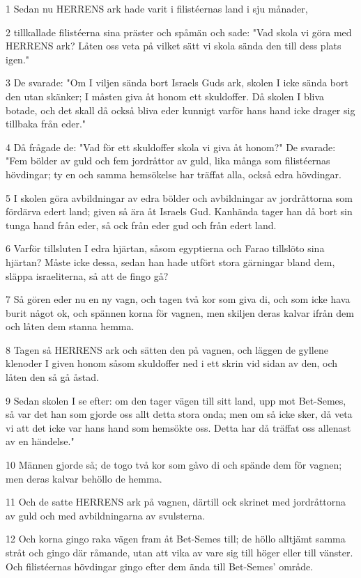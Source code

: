 \par 1 Sedan nu HERRENS ark hade varit i filistéernas land i sju månader,
\par 2 tillkallade filistéerna sina präster och spåmän och sade: "Vad skola vi göra med HERRENS ark? Låten oss veta på vilket sätt vi skola sända den till dess plats igen."
\par 3 De svarade: "Om I viljen sända bort Israels Guds ark, skolen I icke sända bort den utan skänker; I måsten giva åt honom ett skuldoffer. Då skolen I bliva botade, och det skall då också bliva eder kunnigt varför hans hand icke drager sig tillbaka från eder."
\par 4 Då frågade de: "Vad för ett skuldoffer skola vi giva åt honom?" De svarade: "Fem bölder av guld och fem jordråttor av guld, lika många som filistéernas hövdingar; ty en och samma hemsökelse har träffat alla, också edra hövdingar.
\par 5 I skolen göra avbildningar av edra bölder och avbildningar av jordråttorna som fördärva edert land; given så ära åt Israels Gud. Kanhända tager han då bort sin tunga hand från eder, så ock från eder gud och från edert land.
\par 6 Varför tillsluten I edra hjärtan, såsom egyptierna och Farao tillslöto sina hjärtan? Måste icke dessa, sedan han hade utfört stora gärningar bland dem, släppa israeliterna, så att de fingo gå?
\par 7 Så gören eder nu en ny vagn, och tagen två kor som giva di, och som icke hava burit något ok, och spännen korna för vagnen, men skiljen deras kalvar ifrån dem och låten dem stanna hemma.
\par 8 Tagen så HERRENS ark och sätten den på vagnen, och läggen de gyllene klenoder I given honom såsom skuldoffer ned i ett skrin vid sidan av den, och låten den så gå åstad.
\par 9 Sedan skolen I se efter: om den tager vägen till sitt land, upp mot Bet-Semes, så var det han som gjorde oss allt detta stora onda; men om så icke sker, då veta vi att det icke var hans hand som hemsökte oss. Detta har då träffat oss allenast av en händelse."
\par 10 Männen gjorde så; de togo två kor som gåvo di och spände dem för vagnen; men deras kalvar behöllo de hemma.
\par 11 Och de satte HERRENS ark på vagnen, därtill ock skrinet med jordråttorna av guld och med avbildningarna av svulsterna.
\par 12 Och korna gingo raka vägen fram åt Bet-Semes till; de höllo alltjämt samma stråt och gingo där råmande, utan att vika av vare sig till höger eller till vänster. Och filistéernas hövdingar gingo efter dem ända till Bet-Semes' område.
